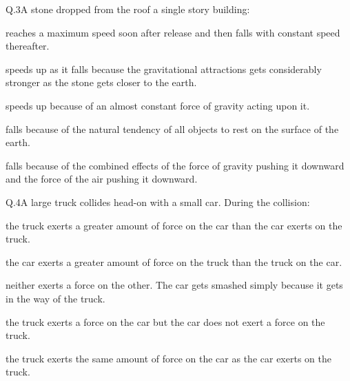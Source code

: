     \begin{mcq}{Q.3}{A stone dropped from the roof a single story building:}

            \item reaches a maximum speed soon after release and then falls with constant speed thereafter.
            \item speeds up as it falls because the gravitational attractions gets considerably stronger as the stone gets closer to the earth.
            \item speeds up because of an almost constant force of gravity acting upon it.
            \item falls because of the natural tendency of all objects to rest on the surface of the earth.
            \item falls because of the combined effects of the force of gravity pushing it downward and the force of the air pushing it downward.
    \end{mcq}


    \begin{mcq}{Q.4}{A large truck collides head-on with a small car. During the collision:}

            \item the truck exerts a greater amount of force on the car than the car exerts on the truck.
            \item the car exerts a greater amount of force on the truck than the truck on the car.
            \item neither exerts a force on the other. The car gets smashed simply because it gets in the way of the truck.
            \item the truck exerts a force on the car but the car does not exert a force on the truck.
            \item the truck exerts the same amount of force on the car as the car exerts on the truck.
    \end{mcq}


